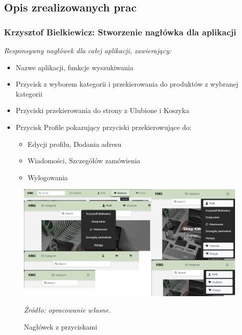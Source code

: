 \documentclass[12pt,a4paper,oneside]{article}
\theoremstyle{definition}
\numberwithin{equation}{section}
\begin{document}
\subsection {Opis zrealizowanych prac}
\subsubsection{Krzysztof Bielkiewicz: Stworzenie nagłówka dla aplikacji}
\label{1.3.1}
\textit{Responsywny nagłówek dla całej aplikacji, zawierający:}
\begin{itemize}
    \item Nazwe aplikacji, funkcje wyszukiwania
    \item Przycisk z wyborem kategorii i przekierowania do produktów z wybranej kategorii
    \item Przyciski przekierowania do strony z Ulubione i Koszyka
    \item Przycisk Profile pokazujący przyciski przekierowujące do:
        \begin{itemize}
            \item Edycji profilu, Dodania adresu
            \item Wiadomości, Szczegółów zamówienia
            \item Wylogowania
        \end{itemize}
\end{itemize}

\begin{figure}[H]
    \centering
    \includegraphics[width=0.9\columnwidth]{images/krzysztofBImages/header.png}
    \caption{Nagłówek z przyciskami}
    \emph{Źródło: opracowanie własne.}
\end{figure}
\end{document}
